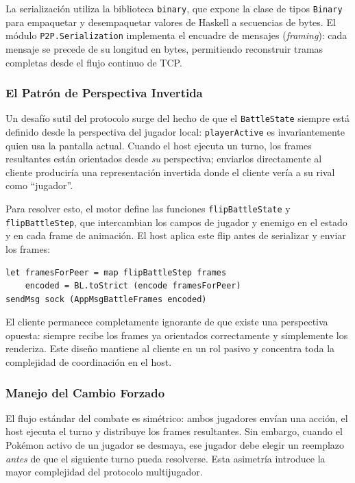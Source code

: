 La serialización utiliza la biblioteca \texttt{binary}, que expone la clase de tipos \texttt{Binary} para empaquetar y desempaquetar valores de Haskell a secuencias de bytes. El módulo \texttt{P2P.Serialization} implementa el encuadre de mensajes (\textit{framing}): cada mensaje se precede de su longitud en bytes, permitiendo reconstruir tramas completas desde el flujo continuo de TCP.

\subsubsection*{El Patrón de Perspectiva Invertida}

Un desafío sutil del protocolo surge del hecho de que el \texttt{BattleState} siempre está definido desde la perspectiva del jugador local: \texttt{playerActive} es invariantemente quien usa la pantalla actual. Cuando el host ejecuta un turno, los frames resultantes están orientados desde \textit{su} perspectiva; enviarlos directamente al cliente produciría una representación invertida donde el cliente vería a su rival como ``jugador''.

Para resolver esto, el motor define las funciones \texttt{flipBattleState} y \texttt{flipBattleStep}, que intercambian los campos de jugador y enemigo en el estado y en cada frame de animación. El host aplica este flip antes de serializar y enviar los frames:

\begin{verbatim}
let framesForPeer = map flipBattleStep frames
    encoded = BL.toStrict (encode framesForPeer)
sendMsg sock (AppMsgBattleFrames encoded)
\end{verbatim}

El cliente permanece completamente ignorante de que existe una perspectiva opuesta: siempre recibe los frames ya orientados correctamente y simplemente los renderiza. Este diseño mantiene al cliente en un rol pasivo y concentra toda la complejidad de coordinación en el host.

\subsubsection*{Manejo del Cambio Forzado}

El flujo estándar del combate es simétrico: ambos jugadores envían una acción, el host ejecuta el turno y distribuye los frames resultantes. Sin embargo, cuando el Pokémon activo de un jugador se desmaya, ese jugador debe elegir un reemplazo \textit{antes} de que el siguiente turno pueda resolverse. Esta asimetría introduce la mayor complejidad del protocolo multijugador.

